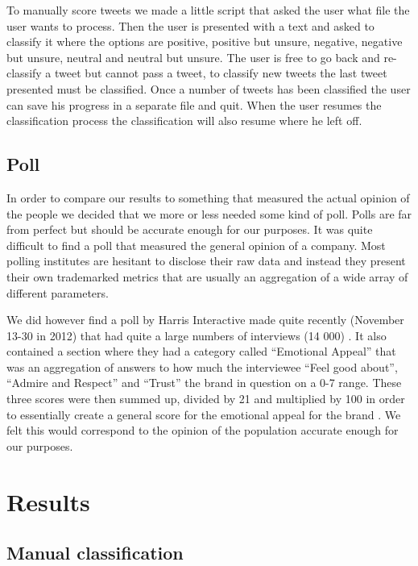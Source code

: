 \documentclass[a4paper,12pt]{report}
\begin{document}
To manually score tweets we made a little script that asked the user what file the user wants to process. 
Then the user is presented with a text and asked to classify it where the options are positive, positive but unsure, negative, negative but unsure, neutral and neutral but unsure. 
The user is free to go back and re-classify a tweet but cannot pass a tweet, to classify new tweets the last tweet presented must be classified. 
Once a number of tweets has been classified the user can save his progress in a separate file and quit. 
When the user resumes the classification process the classification will also resume where he left off.

\section{Poll}

In order to compare our results to something that measured the actual opinion of the people we decided that we more or less needed some kind of poll. 
Polls are far from perfect but should be accurate enough for our purposes. It was quite difficult to find a poll that measured the general opinion of a company. 
Most polling institutes are hesitant to disclose their raw data and instead they present their own trademarked metrics that are usually an aggregation of a wide array of different parameters.

We did however find a poll by Harris Interactive made quite recently (November 13-30 in 2012) that had quite a large numbers of interviews (14 000) \cite{Harris13}. 
It also contained a section where they had a category called “Emotional Appeal” that was an aggregation of answers to how much the interviewee “Feel good about”, “Admire and Respect” and “Trust” the brand in question on a 0-7 range. 
These three scores were then summed up, divided by 21 and multiplied by 100 in order to essentially create a general score for the emotional appeal for the brand \cite{Harris13}. 
We felt this would correspond to the opinion of the population accurate enough for our purposes.

\chapter{Results}

\section{Manual classification}
\end{document}
